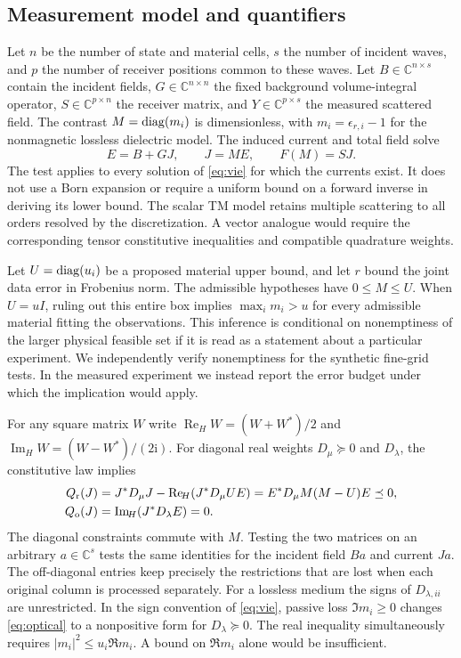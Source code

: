 \documentclass[anonymous,12pt]{iopjournal}
\theoremstyle{remark}\newtheorem{remark}[theorem]{Remark}
\newcommand{\C}{\mathbb C}\newcommand{\R}{\mathbb R}
\newcommand{\Herm}{\operatorname{Re}_{\!H}}\newcommand{\Imag}{\operatorname{Im}_{\!H}}
\newcommand{\Dpos}{D_{\mu}}\newcommand{\Dopt}{D_{\lambda}}
\numberwithin{equation}{section}
\begin{document}
\subsection{Measurement model and quantifiers}
Let $n$ be the number of state and material cells, $s$ the number of incident waves, and $p$ the number of receiver positions common to these waves. Let $B\in\C^{n\times s}$ contain the incident fields, $G\in\C^{n\times n}$ the fixed background volume-integral operator, $S\in\C^{p\times n}$ the receiver matrix, and $Y\in\C^{p\times s}$ the measured scattered field. The contrast $M=\operatorname{diag}(m_i)$ is dimensionless, with $m_i=\epsilon_{r,i}-1$ for the nonmagnetic lossless dielectric model. The induced current and total field solve
\begin{equation}
 E=B+GJ,\qquad J=ME,\qquad F(M)=SJ. \label{eq:vie}
\end{equation}
The test applies to every solution of \eqref{eq:vie} for which the currents exist. It does not use a Born expansion or require a uniform bound on a forward inverse in deriving its lower bound. The scalar TM model retains multiple scattering to all orders resolved by the discretization. A vector analogue would require the corresponding tensor constitutive inequalities and compatible quadrature weights.

Let $U=\operatorname{diag}(u_i)$ be a proposed material upper bound, and let $r$ bound the joint data error in Frobenius norm. The admissible hypotheses have $0\le M\le U$. When $U=uI$, ruling out this entire box implies $\max_i m_i>u$ for every admissible material fitting the observations. This inference is conditional on nonemptiness of the larger physical feasible set if it is read as a statement about a particular experiment. We independently verify nonemptiness for the synthetic fine-grid tests. In the measured experiment we instead report the error budget under which the implication would apply.

For any square matrix $W$ write $\Herm W=(W+W^*)/2$ and $\Imag W=(W-W^*)/(2\mathrm i)$. For diagonal real weights $\Dpos\succeq0$ and $\Dopt$, the constitutive law implies
\begin{align}
 Q_{\rm r}(J)&=J^*\Dpos J-\Herm(J^*\Dpos U E)
       =E^*\Dpos M(M-U)E\preceq0,\label{eq:sector}\\
 Q_{\rm o}(J)&=\Imag(J^*\Dopt E)=0.\label{eq:optical}
\end{align}
The diagonal constraints commute with $M$. Testing the two matrices on an arbitrary $a\in\C^s$ tests the same identities for the incident field $Ba$ and current $Ja$. The off-diagonal entries keep precisely the restrictions that are lost when each original column is processed separately. For a lossless medium the signs of $D_{\lambda,ii}$ are unrestricted. In the sign convention of \eqref{eq:vie}, passive loss $\Im m_i\ge0$ changes \eqref{eq:optical} to a nonpositive form for $\Dopt\succeq0$. The real inequality simultaneously requires $|m_i|^2\le u_i\Re m_i$. A bound on $\Re m_i$ alone would be insufficient.
\end{document}
